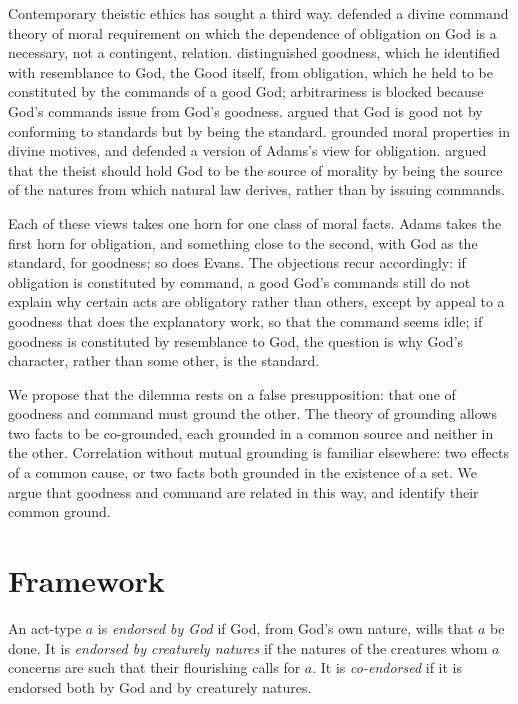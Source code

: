 \documentclass{situationist-preprint}
\begin{document}
Contemporary theistic ethics has sought a third way. \citet{Quinn1978} defended a divine command theory of moral requirement on which the dependence of obligation on God is a necessary, not a contingent, relation. \citet{Adams1999} distinguished goodness, which he identified with resemblance to God, the Good itself, from obligation, which he held to be constituted by the commands of a good God; arbitrariness is blocked because God's commands issue from God's goodness. \citet{Alston1990} argued that God is good not by conforming to standards but by being the standard. \citet{Zagzebski2004} grounded moral properties in divine motives, and \citet{Evans2013} defended a version of Adams's view for obligation. \citet{Murphy2011} argued that the theist should hold God to be the source of morality by being the source of the natures from which natural law derives, rather than by issuing commands.

Each of these views takes one horn for one class of moral facts. Adams takes the first horn for obligation, and something close to the second, with God as the standard, for goodness; so does Evans. The objections recur accordingly: if obligation is constituted by command, a good God's commands still do not explain why certain acts are obligatory rather than others, except by appeal to a goodness that does the explanatory work, so that the command seems idle; if goodness is constituted by resemblance to God, the question is why God's character, rather than some other, is the standard.

We propose that the dilemma rests on a false presupposition: that one of goodness and command must ground the other. The theory of grounding \citep{Fine2012,Schaffer2009,Rosen2010} allows two facts to be co-grounded, each grounded in a common source and neither in the other. Correlation without mutual grounding is familiar elsewhere: two effects of a common cause, or two facts both grounded in the existence of a set. We argue that goodness and command are related in this way, and identify their common ground.

\section{Framework}

\begin{definition}\label{d:coend}
An act-type $a$ is \emph{endorsed by God} if God, from God's own nature, wills that $a$ be done. It is \emph{endorsed by creaturely natures} if the natures of the creatures whom $a$ concerns are such that their flourishing calls for $a$. It is \emph{co-endorsed} if it is endorsed both by God and by creaturely natures.
\end{definition}
\end{document}
